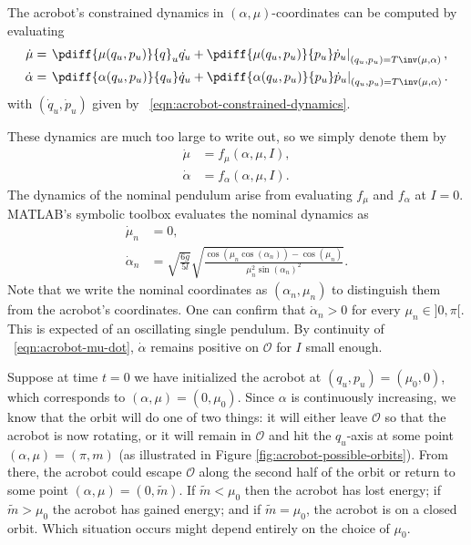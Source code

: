 The acrobot's constrained dynamics in
\((\alpha,\mu)\)-coordinates can be computed by evaluating
\begin{align*}
    \dot{\mu} &= \left.\pdiff{\mu(q_u,p_u)}{q}_u\dot{q_u} +
         \pdiff{\mu(q_u,p_u)}{p_u}\dot{p}_u
         \right|_{(q_u,p_u) = T\inv(\mu,\alpha)}
    , \\
    \dot{\alpha} &= \left.\pdiff{\alpha(q_u,p_u)}{q_u}\dot{q}_u + 
        \pdiff{\alpha(q_u,p_u)}{p_u}\dot{p}_u
        \right|_{(q_u,p_u) = T\inv(\mu,\alpha)}
    .
\end{align*}
with \((\dot{q}_u,\dot{p}_u)\) given by 
 ~\eqref{eqn:acrobot-constrained-dynamics}.

These dynamics are much too large to write out, so we simply denote them by
\begin{align}\label{eqn:acrobot-mu-dot}
    \dot{\mu} &= f_\mu(\alpha,\mu,I)
    ,\\
    \label{eqn:acrobot-alpha-dot}
    \dot{\alpha} &= f_\alpha(\alpha,\mu,I)
    .
\end{align}
The dynamics of the nominal pendulum arise from evaluating
\(f_\mu\) and \(f_\alpha\) at \(I = 0\).
MATLAB's symbolic toolbox evaluates the nominal dynamics as
\begin{align}\label{eqn:acrobot-mu-dot-nom}
    \dot{\mu}_n &= 0
    , \\
    \label{eqn:acrobot-alpha-dot-nom}
    \dot{\alpha}_n &= \sqrt{\frac{6g}{5l}} 
        \sqrt{\frac{\cos(\mu_n\cos(\alpha_n)) - \cos(\mu_n)}
            {\mu_n^2 \sin(\alpha_n)^2}}
    .
\end{align}
Note that we write the nominal coordinates as \((\alpha_n,\mu_n)\) to
distinguish them from the acrobot's coordinates.
One can confirm that \(\dot{\alpha}_n > 0\) for every \(\mu_n \in ]0,\pi[\).
This is expected of an oscillating single pendulum.
By continuity of ~\eqref{eqn:acrobot-mu-dot}, 
\(\dot{\alpha}\) remains positive on \(\mathcal{O}\) for \(I\) small enough.

Suppose at time \(t = 0\) we have initialized the acrobot at 
\((q_u,p_u) = (\mu_0,0)\), which corresponds to \((\alpha,\mu) = (0,\mu_0)\).
Since \(\alpha\) is continuously increasing, we know that the orbit will do one
of two things: it will either leave \(\mathcal{O}\) so that the acrobot is now rotating,
or it will remain in \(\mathcal{O}\) and hit the \(q_u\)-axis at some point 
\((\alpha,\mu) = (\pi,m)\) (as illustrated in Figure
\ref{fig:acrobot-possible-orbits}).
From there, the acrobot could escape \(\mathcal{O}\) along the second half of the orbit or
return to some point \((\alpha,\mu) = (0,\tilde{m})\).
If \(\tilde{m} < \mu_0\) then the acrobot has lost energy; 
if \(\tilde{m} > \mu_0\) the acrobot has gained energy; 
and if \(\tilde{m} = \mu_0\), the acrobot is on a closed orbit.
Which situation occurs might depend entirely on the choice of
\(\mu_0\).

